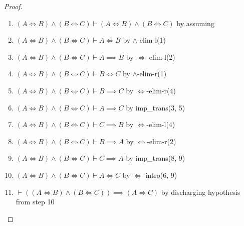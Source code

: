 \begin{proof}
\begin{enumerate}
\item $(A\iff B)\land(B\iff C)\vdash(A\iff B)\land(B\iff C)$ by assuming%
\item $(A\iff B)\land(B\iff C)\vdash A\iff B$ by $\land$-elim-l(1)%
\item $(A\iff B)\land(B\iff C)\vdash A\implies B$ by $\iff$-elim-l(2)%
\item $(A\iff B)\land(B\iff C)\vdash B\iff C$ by $\land$-elim-r(1)%
\item $(A\iff B)\land(B\iff C)\vdash B\implies C$ by $\iff$-elim-r(4)%
\item $(A\iff B)\land(B\iff C)\vdash A\implies C$ by {\Tt{}imp{\_}trans\nwendquote}(3, 5)%
\item $(A\iff B)\land(B\iff C)\vdash C\implies B$ by $\iff$-elim-l(4)%
\item $(A\iff B)\land(B\iff C)\vdash B\implies A$ by $\iff$-elim-r(2)%
\item $(A\iff B)\land(B\iff C)\vdash C\implies A$ by {\Tt{}imp{\_}trans\nwendquote}(8, 9)%
\item $(A\iff B)\land(B\iff C)\vdash A\iff C$ by $\Leftrightarrow$-intro(6, 9)
\item $\vdash((A\iff B)\land(B\iff C))\implies(A\iff C)$ by discharging hypothesis from step 10\qedhere
\end{enumerate}
\end{proof}

